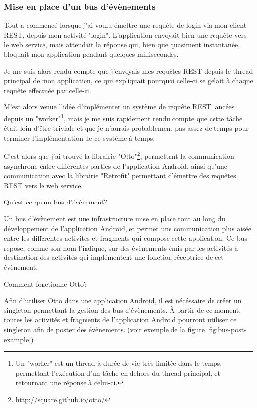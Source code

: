 \documentclass[12pt,table,a4paper]{report}
\begin{document}


\subsubsection{Mise en place d'un bus d'évènements}
Tout a commencé lorsque j'ai voulu émettre une requête de login via mon client REST, depuis mon activité "login". L'application envoyait bien une requête vers le web service, mais attendait la réponse qui, bien que quasiment instantanée, bloquait mon application pendant quelques millisecondes.

Je me suis alors rendu compte que j'envoyais mes requêtes REST depuis le thread principal de mon application, ce qui expliquait pourquoi celle-ci se gelait à chaque requête effectuée par celle-ci.

M'est alors venue l'idée d'implémenter un système de requête REST lancées depuis un "worker"\footnote{Un "worker" est un thread à durée de vie très limitée dans le temps, permettant l'exécution d'un tâche en dehors du thread principal, et retournant une réponse à celui-ci.}, mais je me suis rapidement rendu compte que cette tâche était loin d'être triviale et que je n'aurais probablement pas assez de temps pour terminer l'implémentation de ce système à temps.

C'est alors que j'ai trouvé la librairie "Otto"\footnote{http://square.github.io/otto/}, permettant la communication asynchrone entre différentes parties de l'application Android, ainsi qu'une communication avec la librairie "Retrofit" permettant d'émettre des requêtes REST vers le web service.

\begin{center}
Qu'est-ce qu'un bus d'évènement?
\end{center}

Un bus d'évènement est une infrastructure mise en place tout au long du développement de l'application Android, et permet une communication plus aisée entre les différentes activités et fragments qui compose cette application. Ce bus repose, comme son nom l'indique, sur des évènements émis par les activités à destination des activités qui implémentent une fonction réceptrice de cet évènement.

\begin{center}
Comment fonctionne Otto?
\end{center}

Afin d'utiliser Otto dans une application Android, il est nécéssaire de créer un singleton permettant la gestion des bus d'évènements. À partir de ce moment, toutes les activités et fragments de l'application Android pourront utiliser ce singleton afin de poster des évènements. (voir exemple de la figure \ref{fig:bus-post-example})
\end{document}
